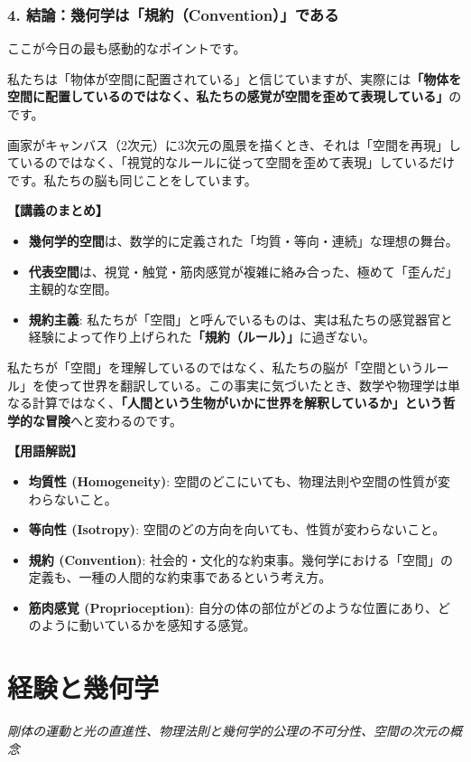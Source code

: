 \documentclass[a4paper,11pt,openany]{ltjsbook}
\begin{document}
\begin{lecturebox}
\subsection*{4. 結論：幾何学は「規約（Convention）」である}
ここが今日の最も感動的なポイントです。

私たちは「物体が空間に配置されている」と信じていますが、実際には\textbf{「物体を空間に配置しているのではなく、私たちの感覚が空間を歪めて表現している」}のです。

画家がキャンバス（2次元）に3次元の風景を描くとき、それは「空間を再現」しているのではなく、「視覚的なルールに従って空間を歪めて表現」しているだけです。私たちの脳も同じことをしています。

\textbf{【講義のまとめ】}
\begin{itemize}[leftmargin=2em]
\item \textbf{幾何学的空間}は、数学的に定義された「均質・等向・連続」な理想の舞台。
\item \textbf{代表空間}は、視覚・触覚・筋肉感覚が複雑に絡み合った、極めて「歪んだ」主観的な空間。
\item \textbf{規約主義}: 私たちが「空間」と呼んでいるものは、実は私たちの感覚器官と経験によって作り上げられた\textbf{「規約（ルール）」}に過ぎない。
\end{itemize}

私たちが「空間」を理解しているのではなく、私たちの脳が「空間というルール」を使って世界を翻訳している。この事実に気づいたとき、数学や物理学は単なる計算ではなく、\textbf{「人間という生物がいかに世界を解釈しているか」という哲学的な冒険}へと変わるのです。

\textbf{【用語解説】}
\begin{itemize}[leftmargin=2em]
\item \textbf{均質性 (Homogeneity)}: 空間のどこにいても、物理法則や空間の性質が変わらないこと。
\item \textbf{等向性 (Isotropy)}: 空間のどの方向を向いても、性質が変わらないこと。
\item \textbf{規約 (Convention)}: 社会的・文化的な約束事。幾何学における「空間」の定義も、一種の人間的な約束事であるという考え方。
\item \textbf{筋肉感覚 (Proprioception)}: 自分の体の部位がどのような位置にあり、どのように動いているかを感知する感覚。
\end{itemize}
\end{lecturebox}


\clearpage
\chapter{経験と幾何学}
\begin{center}\large\textit{剛体の運動と光の直進性、物理法則と幾何学的公理の不可分性、空間の次元の概念}\end{center}
\end{document}
